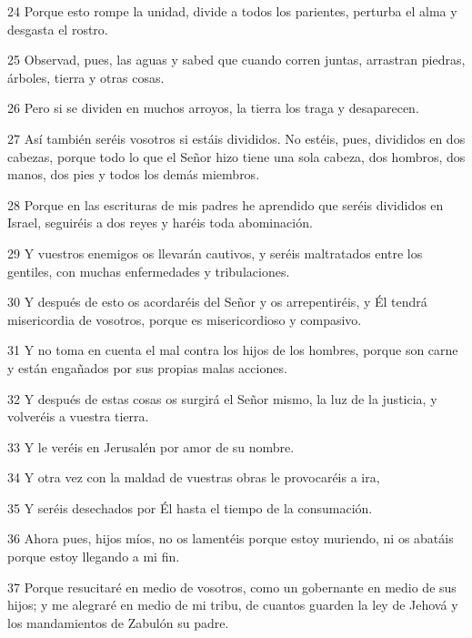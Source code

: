 \par 24 Porque esto rompe la unidad, divide a todos los parientes, perturba el alma y desgasta el rostro.

\par 25 Observad, pues, las aguas y sabed que cuando corren juntas, arrastran piedras, árboles, tierra y otras cosas.

\par 26 Pero si se dividen en muchos arroyos, la tierra los traga y desaparecen.

\par 27 Así también seréis vosotros si estáis divididos. No estéis, pues, divididos en dos cabezas, porque todo lo que el Señor hizo tiene una sola cabeza, dos hombros, dos manos, dos pies y todos los demás miembros.

\par 28 Porque en las escrituras de mis padres he aprendido que seréis divididos en Israel, seguiréis a dos reyes y haréis toda abominación.

\par 29 Y vuestros enemigos os llevarán cautivos, y seréis maltratados entre los gentiles, con muchas enfermedades y tribulaciones.

\par 30 Y después de esto os acordaréis del Señor y os arrepentiréis, y Él tendrá misericordia de vosotros, porque es misericordioso y compasivo.

\par 31 Y no toma en cuenta el mal contra los hijos de los hombres, porque son carne y están engañados por sus propias malas acciones.

\par 32 Y después de estas cosas os surgirá el Señor mismo, la luz de la justicia, y volveréis a vuestra tierra.

\par 33 Y le veréis en Jerusalén por amor de su nombre.

\par 34 Y otra vez con la maldad de vuestras obras le provocaréis a ira,

\par 35 Y seréis desechados por Él hasta el tiempo de la consumación.

\par 36 Ahora pues, hijos míos, no os lamentéis porque estoy muriendo, ni os abatáis porque estoy llegando a mi fin.

\par 37 Porque resucitaré en medio de vosotros, como un gobernante en medio de sus hijos; y me alegraré en medio de mi tribu, de cuantos guarden la ley de Jehová y los mandamientos de Zabulón su padre.

